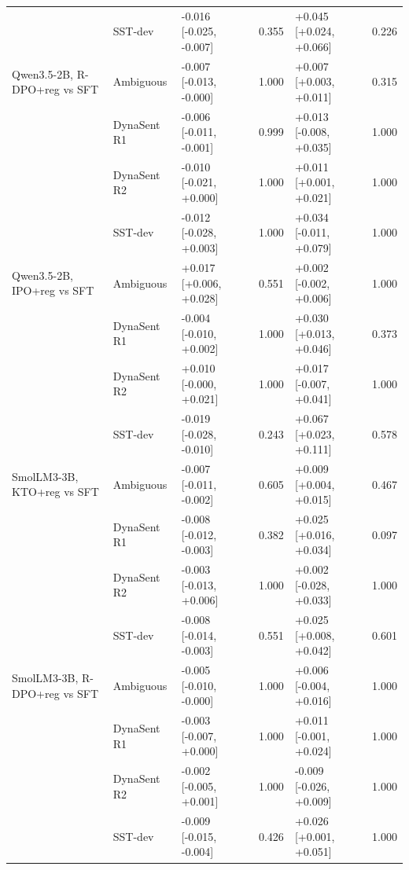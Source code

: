 \begin{table}[t]
\begin{tabular}{llllll}
 & SST-dev & -0.016 [-0.025, -0.007] & 0.355 & +0.045 [+0.024, +0.066] & 0.226 \\
\addlinespace
Qwen3.5-2B, R-DPO+reg vs SFT & Ambiguous & -0.007 [-0.013, -0.000] & 1.000 & +0.007 [+0.003, +0.011] & 0.315 \\
 & DynaSent R1 & -0.006 [-0.011, -0.001] & 0.999 & +0.013 [-0.008, +0.035] & 1.000 \\
 & DynaSent R2 & -0.010 [-0.021, +0.000] & 1.000 & +0.011 [+0.001, +0.021] & 1.000 \\
 & SST-dev & -0.012 [-0.028, +0.003] & 1.000 & +0.034 [-0.011, +0.079] & 1.000 \\
\addlinespace
Qwen3.5-2B, IPO+reg vs SFT & Ambiguous & +0.017 [+0.006, +0.028] & 0.551 & +0.002 [-0.002, +0.006] & 1.000 \\
 & DynaSent R1 & -0.004 [-0.010, +0.002] & 1.000 & +0.030 [+0.013, +0.046] & 0.373 \\
 & DynaSent R2 & +0.010 [-0.000, +0.021] & 1.000 & +0.017 [-0.007, +0.041] & 1.000 \\
 & SST-dev & -0.019 [-0.028, -0.010] & 0.243 & +0.067 [+0.023, +0.111] & 0.578 \\
\addlinespace
SmolLM3-3B, KTO+reg vs SFT & Ambiguous & -0.007 [-0.011, -0.002] & 0.605 & +0.009 [+0.004, +0.015] & 0.467 \\
 & DynaSent R1 & -0.008 [-0.012, -0.003] & 0.382 & +0.025 [+0.016, +0.034] & 0.097 \\
 & DynaSent R2 & -0.003 [-0.013, +0.006] & 1.000 & +0.002 [-0.028, +0.033] & 1.000 \\
 & SST-dev & -0.008 [-0.014, -0.003] & 0.551 & +0.025 [+0.008, +0.042] & 0.601 \\
\addlinespace
SmolLM3-3B, R-DPO+reg vs SFT & Ambiguous & -0.005 [-0.010, -0.000] & 1.000 & +0.006 [-0.004, +0.016] & 1.000 \\
 & DynaSent R1 & -0.003 [-0.007, +0.000] & 1.000 & +0.011 [-0.001, +0.024] & 1.000 \\
 & DynaSent R2 & -0.002 [-0.005, +0.001] & 1.000 & -0.009 [-0.026, +0.009] & 1.000 \\
 & SST-dev & -0.009 [-0.015, -0.004] & 0.426 & +0.026 [+0.001, +0.051] & 1.000 \\
\bottomrule
\end{tabular}
\end{table}
